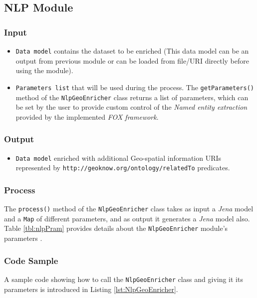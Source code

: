 \documentclass[a4paper,twoside,bibtotoc,abstracton,12pt,BCOR=15mm]{article}
\begin{document}


\subsection{NLP Module}
\subsubsection{Input}
\begin{itemize}
 \item \texttt{Data model} contains the dataset to be enriched 
 (This data model can be an output from previous module or can be loaded from file/URI directly before using the module). 
 \item \texttt{Parameters list} that will be used during the process. The \texttt{getParameters()} method of the \texttt{NlpGeoEnricher} class returns a list of parameters,
 which can be set by the user to provide custom control of the \emph{Named entity extraction} provided by the implemented \emph{FOX framework}.
\end{itemize}

\subsubsection{Output}
\begin{itemize}
 \item \texttt{Data model} enriched with additional Geo-spatial information URIs represented by \texttt{http://geoknow.org/ontology/relatedTo} predicates.
\end{itemize}

\subsubsection{Process}
The \texttt{process()} method of the \texttt{NlpGeoEnricher} class takes as input a \emph{Jena} model and a \texttt{Map} of different parameters, 
and as output it generates a \emph{Jena} model also.
Table \ref{tbl:nlpPram} provides details about the \texttt{NlpGeoEnricher} module's parameters .

\subsubsection{Code Sample}
A sample code showing how to call the \texttt{NlpGeoEnricher} class and giving it its parameters is introduced in Listing \ref{lst:NlpGeoEnricher}.
\end{document}
